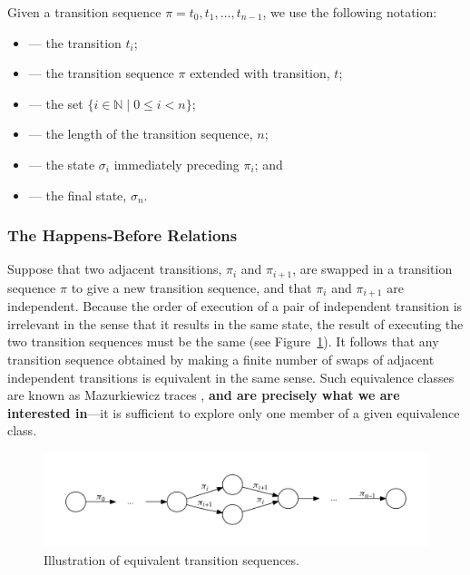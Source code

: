 \documentclass[12pt,a4paper,twoside,openright]{report}
\begin{document}
Given a transition sequence $\pi = t_0, t_1, \ldots, t_{n-1}$,
we use the following notation:
\begin{itemize}[label={}]
	\newcommand{\defsindent}{3.5em}
	\item{\makebox[\defsindent]{\hfill$\pi_i$}
		--- the transition $t_i$;}
	\item{\makebox[\defsindent]{\hfill$\pi.t$}
		--- the transition sequence $\pi$ extended with
		transition, $t$;}
	\item{\makebox[\defsindent]{\hfill$\textit{dom}(\pi)$}
		--- the set $\{i \in \mathbb{N} \mid 0 \leq i < n \}$;}
	\item{\makebox[\defsindent]{\hfill$|\pi|$}
		--- the length of the transition sequence, $n$;}
	\item{\makebox[\defsindent]{\hfill$\textit{pre}(\pi, i)$}
		--- the state $\sigma_i$ immediately preceding $\pi_i$; and}
	\item{\makebox[\defsindent]{\hfill$\textit{last}(\pi)$}
		--- the final state, $\sigma_n$.}
\end{itemize}

\subsubsection{The Happens-Before Relations}\label{sec:happens-before}

Suppose that two adjacent transitions, $\pi_i$ and $\pi_{i+1}$,
are swapped in a
transition sequence $\pi$ to give a new
transition sequence, and that
$\pi_i$ and $\pi_{i+1}$ are independent.
Because the order of execution of a
pair of independent transition is
irrelevant in the sense that it
results in the same state, the result
of executing the two transition
sequences must be the same
(see Figure~\ref{fig:sequence-equivalence}).
It follows that any transition sequence obtained
by making a finite number of swaps of adjacent
independent transitions is equivalent in the same
sense. Such equivalence classes are known as
Mazurkiewicz traces \cite{maz87}, \textbf{and are
precisely what we are interested in}---it is
sufficient to explore only one member of
a given equivalence class.

\begin{figure}
	\centering
	\includegraphics[width=\textwidth]{seqequiv}
	\caption{Illustration of equivalent transition sequences.}
	\label{fig:sequence-equivalence}
\end{figure}
\end{document}
